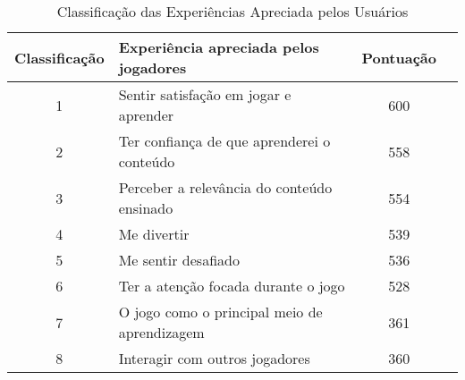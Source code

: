 \begin{table}[htbp]
\centering
\caption{Classificação das Experiências Apreciada pelos Usuários}
\label{tab:exp-pont}
\begin{tabular}{clcl}
\hline
\multicolumn{1}{|c|}{\textbf{Classificação}} & \multicolumn{1}{l|}{\textbf{Experiência apreciada pelos jogadores}} & \multicolumn{1}{c|}{\textbf{Pontuação}} \\ \hline
\multicolumn{1}{|c|}{1}                   & \multicolumn{1}{l|}{Sentir satisfação em jogar e aprender}          & \multicolumn{1}{c|}{600}                   \\ \hline
\multicolumn{1}{|c|}{2}                   & \multicolumn{1}{l|}{Ter confiança de que aprenderei o conteúdo}     & \multicolumn{1}{c|}{558}                   \\ \hline
\multicolumn{1}{|c|}{3}                   & \multicolumn{1}{l|}{Perceber a relevância do conteúdo ensinado}     & \multicolumn{1}{c|}{554}                   \\ \hline
\multicolumn{1}{|c|}{4}                   & \multicolumn{1}{l|}{Me divertir}                                    & \multicolumn{1}{c|}{539}                   \\ \hline
\multicolumn{1}{|c|}{5}                   & \multicolumn{1}{l|}{Me sentir desafiado}                            & \multicolumn{1}{c|}{536}                   \\ \hline
\multicolumn{1}{|c|}{6}                   & \multicolumn{1}{l|}{Ter a atenção focada durante o jogo}            & \multicolumn{1}{c|}{528}                   \\ \hline
\multicolumn{1}{|c|}{7}                   & \multicolumn{1}{l|}{O jogo como o principal meio de aprendizagem}   & \multicolumn{1}{c|}{361}                   \\ \hline
\multicolumn{1}{|c|}{8}                   & \multicolumn{1}{l|}{Interagir com outros jogadores}                 & \multicolumn{1}{c|}{360}                   \\ \hline
                    
\end{tabular}
\end{table}
